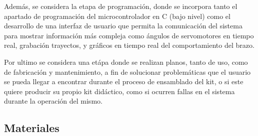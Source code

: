 \vspace{1em}

Además, se considera la etapa de programación, donde se incorpora tanto el apartado de programación del microcontrolador en C (bajo nivel) como el desarrollo de una interfaz de usuario que permita la comunicación del sistema para mostrar información más compleja como ángulos de servomotores en tiempo real, grabación trayectos, y gráficos en tiempo real del comportamiento del brazo.

\vspace{1em}
 
Por ultimo se considera una etápa donde se realizan planos, tanto de uso, como de fabricación y mantenimiento, a fin de solucionar problemáticas que el usuario se pueda llegar a encontrar durante el proceso de ensamblado del kit, o si este quiere producir su propio kit didáctico, como si ocurren fallas en el sistema durante la operación del mismo.

\subsection{Materiales}

